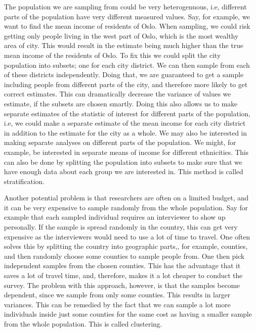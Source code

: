 \documentclass{article}
\begin{document}
The population we are sampling from could be very heterogenuous, i.e, different
parts of the population have very different measured values. Say, for example, we want
to find the mean income of residents of Oslo. When sampling, we could risk
getting only people living in the west part of Oslo, which is the most wealthy
area of city. This would result in the estimate being much higher than the true
mean income of the residents of Oslo. To fix this we could split
the city population into subsets; one for each city district. We can then sample
from each of these districts independently. Doing that, we are guaranteed to get
a sample including people from different parts of the city, and therefore
more likely to get correct estimates. This can dramatically decrease the
variance of values we estimate, if the subsets are chosen smartly. Doing this also allows us to make
separate estimates of the statistic of interest for different parts of the
population, i.e, we could make a separate estimate of the mean income for each city
district in addition to the estimate for the city as a whole. We may also be
interested in making separate analyses on different parts of the population. We
might, for example, be interested in separate means of income for different
ethnicities. This can also be done by splitting the population into subsets to
make sure that we have enough data about each group we are interested in. This method is
called stratification.


Another potential problem is that researchers are often on a limited budget, and
it can be very expensive to sample randomly from the whole population. Say
for example that 
each sampled individual requires an interviewer to show up personally. If the sample is spread randomly in the country, this can get very
expensive as the interviewers would need to use a lot of time to travel. One often solves
this by splitting the country into geographic parts,, for example, counties, and
then randomly choose some counties to sample people from. One then pick
independent samples from the chosen counties. This has the advantage that it
saves a lot of travel time, and, therefore, makes it a lot cheaper to conduct the
survey. The problem with this approach, however, is that the samples become
dependent, since we sample from only some counties. This results in larger
variances. This can be remedied by the fact that we can sample a lot more
individuals inside just some counties for the same
cost as having a smaller sample from the whole
population. This is called clustering.
\end{document}
